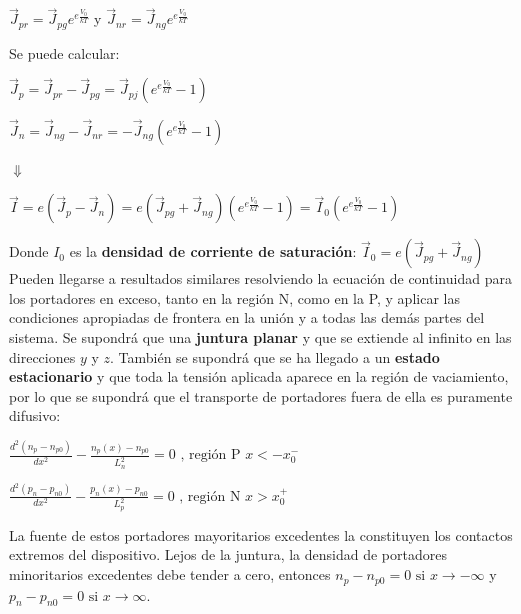 \documentclass[oneside]{book}
\numberwithin{equation}{section}
\numberwithin{figure}{section}
\numberwithin{table}{section}
\begin{document}
				\begin{center}
					$\vec{J}_{pr}=\vec{J}_{pg}e^{e\frac{V_0}{kT}}$ y $\vec{J}_{nr}=\vec{J}_{ng}e^{e\frac{V_0}{kT}}$
				\end{center}
						
				Se puede calcular:\\ 
						
				\begin{center}
						$\displaystyle \vec{J}_p=\vec{J}_{pr}-\vec{J}_{pg}=\vec{J}_{pj}\left(e^{e\frac{V_0}{kT}}-1\right)$
							
						$\displaystyle \vec{J}_n=\vec{J}_{ng}-\vec{J}_{nr}=-\vec{J}_{ng}\left(e^{e\frac{V_0}{kT}}-1\right)$		
						
						$\Downarrow$
						
						$\displaystyle \vec{I}=e\left(\vec{J}_p-\vec{J}_n\right)=e\left(\vec{J}_{pg}+\vec{J}_{ng}\right)\left(e^{e\frac{V_0}{kT}}-1\right)=\vec{I}_0\left(e^{e\frac{V_0}{kT}}-1\right)$
				\end{center}
						
				Donde $I_0$ es la \textbf{densidad de corriente de saturación}: $\displaystyle \vec{I}_0=e\left(\vec{J}_{pg}+\vec{J}_{ng}\right)$\\
				
				Pueden llegarse a resultados similares resolviendo la ecuación de continuidad para los portadores en exceso, tanto en la región N, como en la P, y aplicar las condiciones apropiadas de frontera en la unión y a todas las demás partes del sistema. Se supondrá que una \textbf{juntura planar} y que se extiende al infinito en las direcciones $y$ y $z$. También se supondrá que se ha llegado a un \textbf{estado estacionario} y que toda la tensión aplicada aparece en la región de vaciamiento, por lo que se supondrá que el transporte de portadores fuera de ella es puramente difusivo:\\
				
				\begin{center}
					$\displaystyle \frac{d^2(n_p-n_{p0})}{d x^2}-\frac{n_p(x)-n_{p0}}{L_n^2}=0 \text{ , región P } x<-x_0^-$
					
					$\displaystyle \frac{d^2(p_n-p_{n0})}{d x^2}-\frac{p_n(x)-p_{n0}}{L_p^2}=0 \text{ , región N } x>x_0^+$
				\end{center}
						
				La fuente de estos portadores mayoritarios excedentes la constituyen los contactos extremos del dispositivo. Lejos de la juntura, la densidad de portadores minoritarios excedentes debe tender a cero, entonces $n_p-n_{p0}=0 \text{ si } x \to -\infty$ y $p_n-p_{n0}=0 \text{ si } x \to \infty$.\\
				
\end{document}
